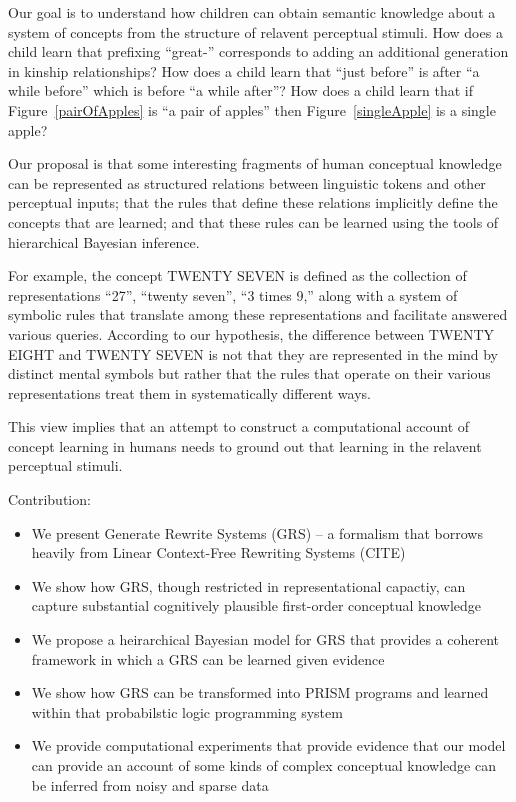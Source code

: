 \documentclass[11pt, twocolumn]{article}
\begin{document}
Our goal is to understand how children can obtain semantic knowledge
about a system of concepts from the structure of relavent perceptual
stimuli. How does a child learn that prefixing ``great-'' corresponds
to adding an additional generation in kinship relationships? How does
a child learn that ``just before'' is after ``a while before'' which
is before ``a while after''? How does a child learn that if
Figure~\ref{pairOfApples} is ``a pair of apples'' then
Figure~\ref{singleApple} is a single apple? 

Our proposal is that some interesting fragments of human conceptual
knowledge can be represented as structured relations between
linguistic tokens and other perceptual inputs; that the rules that
define these relations implicitly define the concepts that are
learned; and that these rules can be learned using the tools of
hierarchical Bayesian inference. 

For example, the concept TWENTY SEVEN is defined as the collection of
representations ``27'', ``twenty seven'', ``3 times 9,'' along with a
system of symbolic rules that translate among these representations
and facilitate answered various queries. According to our hypothesis,
the difference between TWENTY EIGHT and TWENTY SEVEN is not that they
are represented in the mind by distinct mental symbols but rather that
the rules that operate on their various representations treat them in
systematically different ways.

This view implies that an attempt to construct a computational account
of concept learning in humans needs to ground out that learning in the
relavent perceptual stimuli. 

Contribution:
\begin{itemize}
\item We present Generate Rewrite Systems (GRS) -- a formalism that borrows
  heavily from Linear Context-Free Rewriting Systems (CITE)
\item We show how GRS, though restricted in representational capactiy,
  can capture substantial cognitively plausible first-order conceptual knowledge 
\item We propose a heirarchical Bayesian model for GRS that provides a coherent framework in which a GRS can be learned given evidence
\item We show how GRS can be transformed into PRISM programs and learned within that probabilstic logic programming system
\item We provide computational experiments that provide evidence that
  our model can provide an account of some kinds of complex conceptual
  knowledge can be inferred from noisy and sparse data
\end{itemize}
\end{document}
